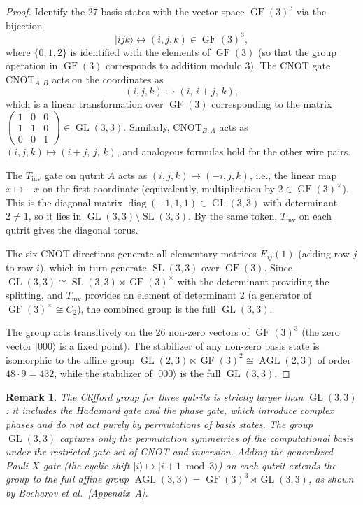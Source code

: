 \documentclass[12pt,a4paper]{article}
\newtheorem{remark}[theorem]{Remark}
\newcommand{\GL}{\operatorname{GL}}
\newcommand{\AGL}{\operatorname{AGL}}
\newcommand{\SL}{\operatorname{SL}}
\newcommand{\GF}{\operatorname{GF}}
\begin{document}
\begin{proof}
Identify the 27 basis states with the vector space $\GF(3)^3$ via the
bijection
\[
|ijk\rangle \leftrightarrow (i,j,k) \in \GF(3)^3,
\]
where $\{0,1,2\}$ is identified with the elements of $\GF(3)$
(so that the group operation in $\GF(3)$ corresponds to addition modulo 3).
The CNOT gate $\text{CNOT}_{A,B}$ acts on the coordinates as
\[
(i,j,k) \mapsto (i,\, i+j,\, k),
\]
which is a linear transformation over $\GF(3)$ corresponding to the
matrix $\begin{pmatrix}1&0&0\\1&1&0\\0&0&1\end{pmatrix} \in \GL(3,3)$.
Similarly, $\text{CNOT}_{B,A}$ acts as $(i,j,k) \mapsto (i+j,\, j,\, k)$,
and analogous formulas hold for the other wire pairs.

The $T_{\text{inv}}$ gate on qutrit $A$ acts as $(i,j,k) \mapsto (-i, j, k)$,
i.e., the linear map $x \mapsto -x$ on the first coordinate (equivalently,
multiplication by $2 \in \GF(3)^\times$). This is the diagonal matrix
$\operatorname{diag}(-1,1,1) \in \GL(3,3)$ with determinant $2 \neq 1$,
so it lies in $\GL(3,3) \setminus \SL(3,3)$. By the same token,
$T_{\text{inv}}$ on each qutrit gives the diagonal torus.

The six CNOT directions generate all elementary matrices $E_{ij}(1)$
(adding row $j$ to row $i$), which in turn generate $\SL(3,3)$ over
$\GF(3)$. Since $\GL(3,3) \cong \SL(3,3) \rtimes \GF(3)^\times$ with
the determinant providing the splitting, and $T_{\text{inv}}$ provides
an element of determinant $2$ (a generator of $\GF(3)^\times \cong C_2$),
the combined group is the full $\GL(3,3)$.

The group acts transitively on the $26$ non-zero vectors of $\GF(3)^3$
(the zero vector $|000\rangle$ is a fixed point). The stabilizer of any
non-zero basis state is isomorphic to the affine group
$\GL(2,3) \ltimes \GF(3)^2 \cong \AGL(2,3)$ of order $48 \cdot 9 = 432$,
while the stabilizer of $|000\rangle$ is the full $\GL(3,3)$.
\end{proof}

\begin{remark}
The Clifford group for three qutrits is strictly larger than $\GL(3,3)$:
it includes the Hadamard gate and the phase gate, which introduce complex
phases and do not act purely by permutations of basis states. The group
$\GL(3,3)$ captures only the \emph{permutation} symmetries of the
computational basis under the restricted gate set of CNOT and inversion.
Adding the generalized Pauli $X$ gate (the cyclic shift
$|i\rangle \mapsto |i+1 \bmod 3\rangle$) on each qutrit extends the
group to the full affine group $\AGL(3,3) = \GF(3)^3 \rtimes \GL(3,3)$,
as shown by Bocharov et al.~\cite{bocharov2016improved}[Appendix~A].
\end{remark}
\end{document}
